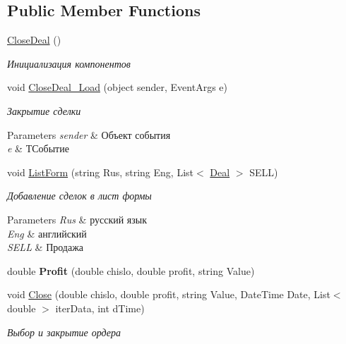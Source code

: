 \subsection*{Public Member Functions}
\begin{DoxyCompactItemize}
\item 
\hyperlink{class_client_1_1_close_deal_a405298882ae55f600ca25b00898159f3}{Close\+Deal} ()
\begin{DoxyCompactList}\small\item\em Инициализация компонентов \end{DoxyCompactList}\item 
void \hyperlink{class_client_1_1_close_deal_a2693cd775d06cfc1a31b68523eac5b86}{Close\+Deal\+\_\+\+Load} (object sender, Event\+Args e)
\begin{DoxyCompactList}\small\item\em Закрытие сделки 
\begin{DoxyParams}{Parameters}
{\em sender} & Объект события\\
\hline
{\em e} & ТСобытие\\
\hline
\end{DoxyParams}
\end{DoxyCompactList}\item 
void \hyperlink{class_client_1_1_close_deal_a540ae3b166b32a9957fc86d27f39dbd1}{List\+Form} (string Rus, string Eng, List$<$ \hyperlink{class_client_1_1_deal}{Deal} $>$ S\+E\+LL)
\begin{DoxyCompactList}\small\item\em Добавление сделок в лист формы 
\begin{DoxyParams}{Parameters}
{\em Rus} & русский язык\\
\hline
{\em Eng} & английский\\
\hline
{\em S\+E\+LL} & Продажа\\
\hline
\end{DoxyParams}
\end{DoxyCompactList}\item 
\hypertarget{class_client_1_1_close_deal_a1a032066cdeea7795714a3dea0271805}{}\label{class_client_1_1_close_deal_a1a032066cdeea7795714a3dea0271805} 
double {\bfseries Profit} (double chislo, double profit, string Value)
\item 
void \hyperlink{class_client_1_1_close_deal_a99ff7b19b66fefbcc3ea5b45bf02a88d}{Close} (double chislo, double profit, string Value, Date\+Time Date, List$<$ double $>$ iter\+Data, int d\+Time)
\begin{DoxyCompactList}\small\item\em Выбор и закрытие ордера 

\end{DoxyCompactList}
\end{DoxyCompactItemize}
